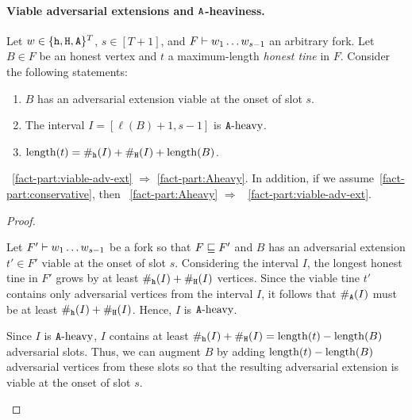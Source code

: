     \paragraph{Viable adversarial extensions and $\mathtt{A}$-heaviness.} 
    Let $w \in \{\mathtt{h}, \mathtt{H}, \mathtt{A}\}^T$,   
    $s \in [T + 1]$, and 
    $F \vdash w_1 \ldots w_{s - 1}$ an arbitrary fork. 
    Let $B \in F$ be an honest vertex 
    and $t$ a maximum-length \emph{honest tine} in $F$.
    Consider the following statements: 
    \begin{enumerate}[label=(\alph*)]
      \item \label{fact-part:viable-adv-ext} $B$ has an adversarial extension viable at the onset of slot $s$.
      \item \label{fact-part:Aheavy} The interval $I = [\ell(B) + 1, s - 1]$ is $\mathtt{A}\text{-heavy}$. 
      \item \label{fact-part:conservative} $\operatorname{length}(t) = \#_{\mathtt{h}}(I) + \#_{\mathtt{H}}(I) + \operatorname{length}(B)$.     
    \end{enumerate}



    \begin{proposition}[]\label{prop:fork-structure}
    ~\ref{fact-part:viable-adv-ext} $\Longrightarrow$
    \ref{fact-part:Aheavy}.
    In addition, if we assume~\ref{fact-part:conservative}, then 
    ~\ref{fact-part:Aheavy} $\Longrightarrow$ 
    ~\ref{fact-part:viable-adv-ext}.
    \end{proposition}

    \begin{proof}~
      \begin{description}[font=\normalfont\itshape\space]
        \item[\ref{fact-part:viable-adv-ext} implies~\ref{fact-part:Aheavy}.]
        Let $F' \vdash w_1 \ldots w_{s-1}$ be 
        a fork so that $F \sqsubseteq F'$ 
        and $B$ has an adversarial extension $t' \in F'$ 
        viable at the onset of slot $s$. 
        Considering the interval $I$, 
        the longest honest tine in $F'$ 
        grows by at least $\#_{\mathtt{h}}(I) + \#_{\mathtt{H}}(I)$ vertices. 
        Since the viable tine $t'$ 
        contains only adversarial vertices from the interval $I$, 
        it follows that $\#_{\mathtt{A}}(I)$ must be at least $\#_{\mathtt{h}}(I) + \#_{\mathtt{H}}(I)$. 
        Hence, $I$ is $\mathtt{A}\text{-heavy}$.

        \item[\ref{fact-part:conservative} and \ref{fact-part:Aheavy} implies~\ref{fact-part:viable-adv-ext}.]
        Since $I$ is $\mathtt{A}\text{-heavy}$,  
        $I$ contains at least $\#_{\mathtt{h}}(I) + \#_{\mathtt{H}}(I) = \operatorname{length}(t) - \operatorname{length}(B)$ 
        adversarial slots. 
        Thus, we can augment $B$ by adding 
        $\operatorname{length}(t) - \operatorname{length}(B)$ adversarial vertices 
        from these slots 
        so that 
        the resulting adversarial extension is viable 
        at the onset of slot $s$.
      \end{description}
    \end{proof}






